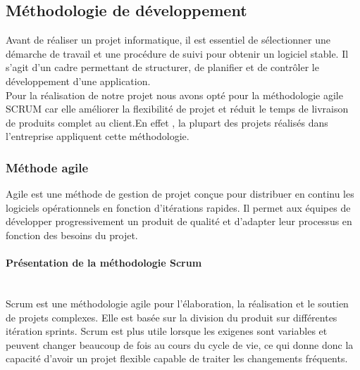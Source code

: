 \subsection{\selectfont\Large Méthodologie de développement }

 Avant de réaliser un projet informatique, il est essentiel de sélectionner une démarche de travail et une procédure de suivi pour obtenir un logiciel stable. Il s'agit d'un cadre permettant de structurer, de planifier et de contrôler le développement d'une application.\\
Pour la réalisation de notre projet nous avons opté pour la méthodologie agile SCRUM car elle
améliorer la flexibilité de projet et réduit le temps de livraison de produits complet au client.En
effet , la plupart des projets réalisés dans l’entreprise appliquent cette méthodologie.
 \\[0.2cm]


\subsubsection{\selectfont\Large Méthode agile }

Agile est une méthode de gestion de projet conçue pour distribuer en continu les logiciels opérationnels en fonction d'itérations rapides. Il permet aux équipes de développer progressivement un produit de qualité et d'adapter leur processus en fonction des besoins du projet.


\paragraph{\selectfont\Large  Présentation de la méthodologie Scrum}
\texttt{}\\[0.2cm]

Scrum est une méthodologie agile pour l'élaboration, la réalisation et le soutien de projets complexes. Elle est basée sur la division du produit sur différentes itération sprints.
Scrum est plus utile lorsque les exigenes sont variables et peuvent changer beaucoup de fois au cours du cycle de vie, ce qui donne donc la capacité d'avoir un projet flexible capable de traiter les changements fréquents.
